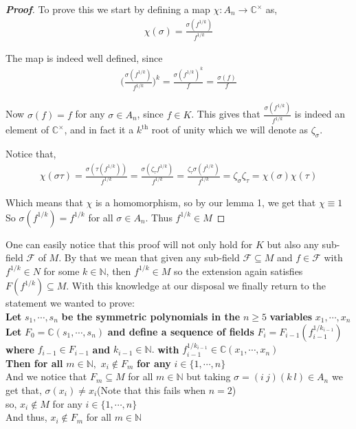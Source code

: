 \begin{proof}[\textbf{Proof}]
To prove this we start by defining a map $\chi:A_n\rightarrow\mathbb{C}^{\times}$ as,
\begin{align*}
\chi(\sigma)=\frac{\sigma(f^{1/k})}{f^{1/k}}
\end{align*}

The map is indeed well defined, since
\begin{align*}
\bigg(\frac{\sigma(f^{1/k})}{f^{1/k}}\bigg)^k=\frac{\sigma(f^{1/k})^k}{f}=\frac{\sigma(f)}{f}
\end{align*}

Now $\sigma(f)=f$ for any $\sigma\in A_n$, since $f\in K$. This gives that $\frac{\sigma(f^{1/k})}{f^{1/k}}$ is indeed an element of $\mathbb{C}^{\times}$, and in fact it a $k^\text{th}$ root of unity which we will denote as $\zeta_{\sigma}$.

Notice that,
\begin{align*}
\chi(\sigma\tau)=\frac{\sigma(\tau(f^{1/k}))}{f^{1/k}}=\frac{\sigma(\zeta_{\tau}f^{1/k})}{f^{1/k}}=\frac{\zeta_{\tau}\sigma(f^{1/k})}{f^{1/k}}=\zeta_{\sigma}\zeta_{\tau}=\chi(\sigma)\chi(\tau)
\end{align*}

Which means that $\chi$ is a homomorphism, so by our lemma 1, we get that $\chi\equiv 1$
So $\sigma(f^{1/k})=f^{1/k}$ for all $\sigma\in A_n$. Thus $f^{1/k}\in M$
\end{proof}

One can easily notice that this proof will not only hold for $K$ but also any sub-field $\mathcal{F}$ of $M$. By that we mean that given any sub-field $\mathcal{F}\subseteq M$ and $f\in\mathcal{F}$ with $f^{1/k}\in N$ for some $k\in\mathbb{N}$, then $f^{1/k}\in M$ so the extension again satisfies $F(f^{1/k})\subseteq M$. With this knowledge at our disposal we finally return to the statement we wanted to prove:\\

\textbf{Let } $s_1,\cdots,s_n$ \textbf{ be the symmetric polynomials in the } $n\geq 5$ \textbf{ variables } $x_1,\cdots,x_n$ \\ \textbf{Let }  $F_0=\mathbb{C}(s_1,\cdots,s_n)$ \textbf{ and define a sequence of fields } $F_i=F_{i-1}(f_{i-1}^{1/k_{i-1}})$ \textbf{ where } $f_{i-1}\in F_{i-1}$ \textbf{ and } $k_{i-1}\in\mathbb{N}.$ \textbf{ with } $f_{i-1}^{1/k_{i-1}}\in\mathbb{C}(x_1,\cdots,x_n)$ \\
 \textbf{ Then for all } $m\in\mathbb{N},$
$x_i\notin F_m$ \textbf{ for any } $i\in\{1,\cdots,n\}$\\

And we notice that $F_m\subseteq M$ for all $m\in\mathbb{N}$ but taking $\sigma=(i\ j)(k\ l)\in A_n$ we get that, $\sigma(x_i)\neq x_i$(Note that this fails when $n=2$)\\
so, $x_i\notin M$ for any $i\in\{1,\cdots,n\}$\\
And thus, $x_i\notin F_m$ for all $m\in\mathbb{N}$

